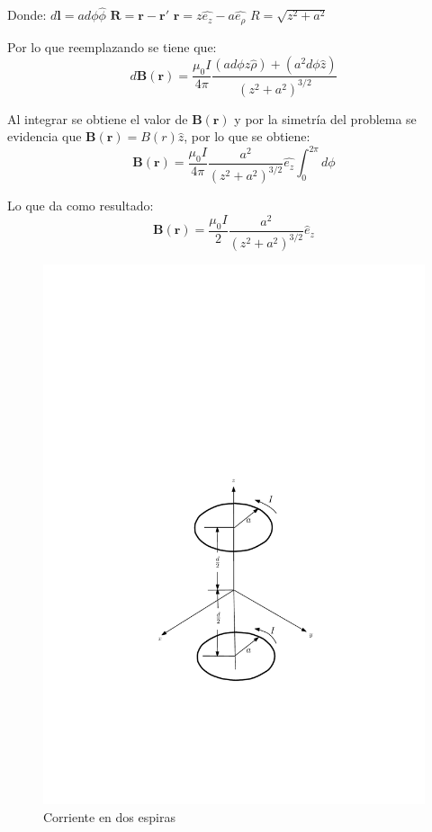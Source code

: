 Donde:
$d\mathbf{l}=a d\phi \hat{\phi}$
$\mathbf{R}=\mathbf{r}-\mathbf{r'}$
$\mathbf{r}=z\hat{e_{z}}-a\hat{e_{\rho}}$
$R=\sqrt{z^{2}+a^{2}}$

Por lo que reemplazando se tiene que:
\begin{equation}
  d\mathbf{B}(\mathbf{r}) = \frac{\mu_{0}I}{4\pi} \frac{(a d\phi z \hat{\rho}) + (a^{2}d\phi \hat{z})}{(z^{2}+a^{2})^{3/2}}
\end{equation}

Al integrar se obtiene el valor de $\mathbf{B}(\mathbf{r})$ y por la simetría
del problema se evidencia que $\mathbf{B}(\mathbf{r}) = B(r)\hat{z}$,
por lo que se obtiene:
\begin{equation}
  \mathbf{B}(\mathbf{r}) = \frac{\mu_{0}I}{4 \pi} \frac{a^{2}}{(z^{2}+a^{2})^{3/2}} \hat{e_{z}} \int _{0}^{2 \pi} d\phi
\end{equation}

Lo que da como resultado:
\begin{equation}
  \mathbf{B}(\mathbf{r}) = \frac{\mu_{0}I}{2} \frac{a^{2}}{(z^{2}+a^{2})^{3/2}} \hat{e}_{z}
  \label{eq:Campo_magnetico_espira}
\end{equation}

\begin{figure}[H]
  \centering
  \includegraphics[width=0.6\linewidth]{./images/two-loops.pdf}
  \caption{Corriente en dos espiras}
  \label{fig:I_en_dos_espiras}
\end{figure}

